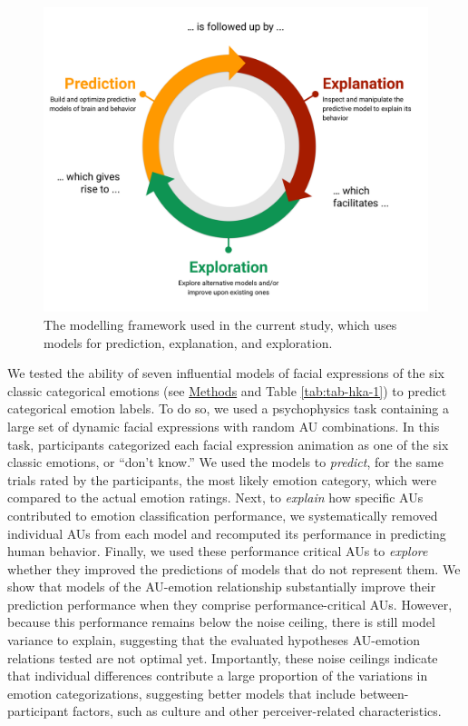 \documentclass[11pt,american,a4paper,oneside,]{memoir} %
\begin{document}
\begin{figure}
\centering
\includegraphics{_bookdown_files/hypothesis-kernel-analysis-files/figures/figure_1.pdf}
\caption{\label{fig:fig-hka-1}The modelling framework used in the current study, which uses models for prediction, explanation, and exploration.}
\end{figure}



We tested the ability of seven influential models of facial expressions of the six classic categorical emotions (see \protect\hyperlink{hka-methods}{Methods} and Table \ref{tab:tab-hka-1}) to predict categorical emotion labels. To do so, we used a psychophysics task containing a large set of dynamic facial expressions with random AU combinations. In this task, participants categorized each facial expression animation as one of the six classic emotions, or ``don't know.'' We used the models to \emph{predict}, for the same trials rated by the participants, the most likely emotion category, which were compared to the actual emotion ratings. Next, to \emph{explain} how specific AUs contributed to emotion classification performance, we systematically removed individual AUs from each model and recomputed its performance in predicting human behavior. Finally, we used these performance critical AUs to \emph{explore} whether they improved the predictions of models that do not represent them. We show that models of the AU-emotion relationship substantially improve their prediction performance when they comprise performance-critical AUs. However, because this performance remains below the noise ceiling, there is still model variance to explain, suggesting that the evaluated hypotheses AU-emotion relations tested are not optimal yet. Importantly, these noise ceilings indicate that individual differences contribute a large proportion of the variations in emotion categorizations, suggesting better models that include between-participant factors, such as culture and other perceiver-related characteristics.
\end{document}
